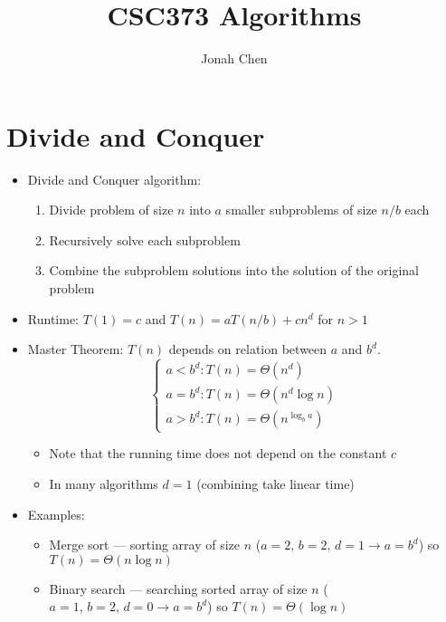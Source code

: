 \documentclass[a4paper]{article}
\title{CSC373 Algorithms}
\author{Jonah Chen}
\date{}
\begin{document}
\maketitle
\sffamily
\section{Divide and Conquer}
\begin{itemize}
    \item Divide and Conquer algorithm:
    \begin{enumerate}
        \item Divide problem of size $n$ into $a$ smaller subproblems of size $n/b$ each
        \item Recursively solve each subproblem
        \item Combine the subproblem solutions into the solution of the original problem
    \end{enumerate}
    \item Runtime: $T(1)=c$ and $T(n)=a T(n/b) + cn^d$ for $n>1$
    \item Master Theorem: $T(n)$ depends on relation between $a$ and $b^d$. \begin{equation}
        \begin{cases}
            a<b^d: T(n)=\Theta(n^d)\\
            a=b^d: T(n)=\Theta(n^d\log n)\\
            a>b^d: T(n)=\Theta(n^{\log_b a})
        \end{cases}
    \end{equation}
    \begin{itemize}
        \item Note that the running time does not depend on the constant $c$
        \item In many algorithms $d=1$ (combining take linear time)
    \end{itemize}
    \item Examples:
    \begin{itemize}
        \item Merge sort --- sorting array of size $n$ ($a=2,\,b=2,\,d=1\rightarrow a=b^d$) so $T(n)=\Theta(n\log n)$
        \item Binary search --- searching sorted array of size $n$ ($a=1,\,b=2,\,d=0\rightarrow a=b^d$) so $T(n)=\Theta(\log n)$
    \end{itemize}
\end{itemize}
\end{document}
